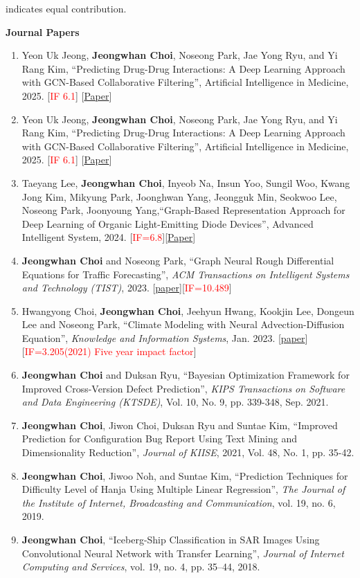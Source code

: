 \documentclass[10pt]{article}
\newenvironment{changemargin}[2]{
  \begin{list}{}{
    \setlength{\topsep}{0pt}
    \setlength{\leftmargin}{#1}
    \setlength{\rightmargin}{#2}
    \setlength{\listparindent}{\parindent}
    \setlength{\itemindent}{\parindent}
    \setlength{\parsep}{\parskip}
  }
  \item[]}{\end{list}
}
\newcommand{\RED}[1]{\textcolor{red}{#1}}
\newenvironment{body} {
	\vspace*{-16pt}
	\begin{changemargin}{-0.25in}{-0.5in}
  }
	{\end{changemargin}
}
\begin{document}
\begin{body}
	\vspace{14pt}
{\small * indicates equal contribution.}
	\vspace{14pt}

\textbf{Journal Papers}
\begin{enumerate}
    \item Yeon Uk Jeong, \textbf{Jeongwhan Choi}, Noseong Park, Jae Yong Ryu, and Yi Rang Kim, ``Predicting Drug-Drug Interactions: A Deep Learning Approach with GCN-Based Collaborative Filtering'', Artificial Intelligence in Medicine, 2025. [\RED{IF 6.1}] [\href{https://doi.org/10.1016/j.artmed.2025.103185}{Paper}]
    \item Yeon Uk Jeong, \textbf{Jeongwhan Choi}, Noseong Park, Jae Yong Ryu, and Yi Rang Kim, ``Predicting Drug-Drug Interactions: A Deep Learning Approach with GCN-Based Collaborative Filtering'', Artificial Intelligence in Medicine, 2025. [\RED{IF 6.1}] [\href{https://doi.org/10.1016/j.artmed.2025.103185}{Paper}]
    \item Taeyang Lee, \textbf{Jeongwhan Choi}, Inyeob Na, Insun Yoo, Sungil Woo, Kwang Jong Kim, Mikyung Park, Joonghwan Yang, Jeongguk Min, Seokwoo Lee, Noseong Park, Joonyoung Yang,``Graph-Based Representation Approach for Deep Learning of Organic Light-Emitting Diode Devices'', Advanced Intelligent System, 2024. [\RED{IF=6.8}][\href{https://onlinelibrary.wiley.com/doi/10.1002/aisy.202400598}{Paper}]
    \item \textbf{Jeongwhan Choi} and Noseong Park, ``Graph Neural Rough Differential Equations for Traffic Forecasting'', \emph{ACM Transactions on Intelligent Systems and Technology (TIST)}, 2023. [\href{https://dl.acm.org/doi/abs/10.1145/3604808}{paper}][\RED{IF=10.489}]
    \item Hwangyong Choi, \textbf{Jeongwhan Choi}, Jeehyun Hwang, Kookjin Lee, Dongeun Lee and Noseong Park, ``Climate Modeling with Neural Advection-Diffusion Equation'', \emph{Knowledge and Information Systems}, Jan. 2023. [\href{https://doi.org/10.1007/s10115-023-01829-2}{paper}] [\RED{IF=3.205(2021) Five year impact factor}]
    \item \textbf{Jeongwhan Choi} and Duksan Ryu, ``Bayesian Optimization Framework for Improved Cross-Version Defect Prediction'', \emph{KIPS Transactions on Software and Data Engineering (KTSDE)}, Vol. 10, No. 9, pp. 339-348, Sep. 2021.
    \item \textbf{Jeongwhan Choi}, Jiwon Choi, Duksan Ryu and Suntae Kim, ``Improved Prediction for Configuration Bug Report Using Text Mining and Dimensionality Reduction'', \emph{Journal of KIISE}, 2021, Vol. 48, No. 1, pp. 35-42.
    \item \textbf{Jeongwhan Choi}, Jiwoo Noh, and Suntae Kim, ``Prediction Techniques for Difficulty Level of Hanja Using Multiple Linear Regression'', \emph{The Journal of the Institute of Internet, Broadcasting and Communication}, vol. 19, no. 6, 2019.
    \item \textbf{Jeongwhan Choi}, ``Iceberg-Ship Classification in SAR Images Using Convolutional Neural Network with Transfer Learning'', \emph{Journal of Internet Computing and Services}, vol. 19, no. 4, pp. 35–44, 2018.
\end{enumerate}


\end{body}
\end{document}
